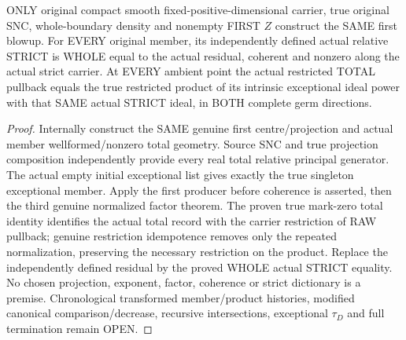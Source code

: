 \begin{theorem}
\label{hir:sharp-original-first-member-whole-strict-and-normalized-factor}
\leanok
ONLY original compact smooth fixed-positive-dimensional carrier, true
original SNC, whole-boundary density and nonempty FIRST $Z$ construct the
SAME first blowup. For EVERY original member, its independently defined
actual relative STRICT is WHOLE equal to the actual residual, coherent and
nonzero along the actual strict carrier. At EVERY ambient point the actual
restricted TOTAL pullback equals the true restricted product of its intrinsic
exceptional ideal power with that SAME actual STRICT ideal, in BOTH complete
germ directions.
\end{theorem}
\begin{proof}
Internally construct the SAME genuine first centre/projection and actual
member wellformed/nonzero total geometry. Source SNC and true projection
composition independently provide every real total relative principal
generator. The actual empty initial exceptional list gives exactly the true
singleton exceptional member. Apply the first producer before coherence is
asserted, then the third genuine normalized factor theorem. The proven true
mark-zero total identity identifies the actual total record with the carrier
restriction of RAW pullback; genuine restriction idempotence removes only
the repeated normalization, preserving the necessary restriction on the
product. Replace the independently defined residual by the proved WHOLE
actual STRICT equality. No chosen projection, exponent, factor, coherence
or strict dictionary is a premise. Chronological transformed member/product
histories, modified canonical comparison/decrease, recursive intersections,
exceptional $\tau_D$ and full termination remain OPEN.
\end{proof}
